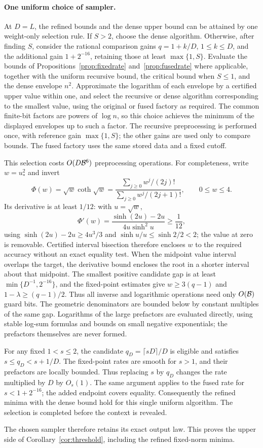 \paragraph{One uniform choice of sampler.}
At \(D=L\), the refined bounds and the dense upper bound can be
attained by one weight-only selection rule. If \(S>2\), choose
the dense algorithm. Otherwise, after finding \(S\),
consider the rational comparison gains \(q=1+k/D\), \(1\le k\le D\),
and the additional gain \(1+2^{-16}\), retaining those at least
\(\max\{1,S\}\). Evaluate the bounds of
Propositions~\ref{prop:fixedrate}
and~\ref{prop:fusedrate} where applicable, together with the uniform recursive bound, the
critical bound when \(S\le1\), and the dense envelope \(n^2\).
Approximate the logarithm of each envelope by a certified upper
value within one, and select the recursive or dense algorithm
corresponding to the smallest value, using the original or fused
factory as required. The common finite-bit factors
are powers of \(\log n\), so this choice achieves the minimum of
the displayed envelopes up to such a factor. The recursive preprocessing is performed once, with reference gain
\(\max\{1,S\}\); the other gains are used only to compare bounds.
The fused factory uses the same stored data and a fixed cutoff.

This selection costs \(O(D\mathcal B^6)\) preprocessing operations.
For completeness, write \(w=u_*^2\) and invert
\[
\Phi(w)=\sqrt w\coth\sqrt w
=\frac{\sum_{j\ge0}w^j/(2j)!}
       {\sum_{j\ge0}w^j/(2j+1)!},\qquad 0\le w\le4.
\]
Its derivative is at least \(1/12\): with \(u=\sqrt w\),
\[
\Phi'(w)=\frac{\sinh(2u)-2u}{4u\sinh^2u}\ge\frac1{12},
\]
using \(\sinh(2u)-2u\ge4u^3/3\) and
\(\sinh u/u\le\sinh2/2<2\); the value at zero is removable.
Certified interval bisection therefore encloses \(w\) to the
required accuracy without an exact equality test. When the midpoint
value interval overlaps the target, the derivative bound encloses
the root in a shorter interval about that midpoint. The smallest
positive candidate gap is at least \(\min\{D^{-1},2^{-16}\}\),
and the fixed-point estimates give
\(w\ge3(q-1)\) and \(1-\lambda\ge(q-1)/2\).
Thus all inverse and logarithmic operations need only \(O(\mathcal B)\)
guard bits. The geometric denominators are bounded below by constant
multiples of the same gap. Logarithms of the large prefactors are
evaluated directly, using stable log-sum formulas and bounds on
small negative exponentials; the prefactors themselves are never
formed.

For any fixed \(1<s\le2\), the candidate
\(q_D=\lceil sD\rceil/D\) is eligible and satisfies
\(s\le q_D<s+1/D\). The fixed-point rates are smooth for
\(s>1\), and their prefactors are locally bounded. Thus replacing
\(s\) by \(q_D\) changes the rate multiplied by \(D\) by
\(O_s(1)\). The same argument applies to the fused rate for
\(s<1+2^{-16}\); the added endpoint covers equality. Consequently
the refined minima with the dense bound hold for this single
uniform algorithm. The selection is completed before the context
is revealed.

The chosen sampler therefore retains its exact output law.
This proves the upper side of Corollary~\ref{cor:threshold}, including
the refined fixed-norm minima.
